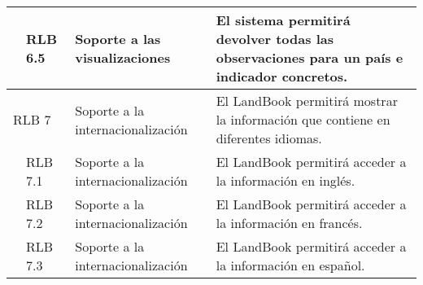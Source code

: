\begin{longtable}[c]{|p{1mm}|p{14mm}|p{30mm}|p{90mm}|}
\hline
& RLB 6.5 & Soporte a las visualizaciones & El sistema permitirá devolver todas las observaciones para un país e indicador concretos. \\
\hline
\multicolumn{2}{|l|}{RLB 7}  & Soporte a la internacionalización & El LandBook permitirá mostrar la información que contiene en diferentes idiomas. \\
\hline
& RLB 7.1 & Soporte a la internacionalización & El LandBook permitirá acceder a la información en inglés. \\
\hline
& RLB 7.2 & Soporte a la internacionalización & El LandBook permitirá acceder a la información en francés. \\
\hline
& RLB 7.3 & Soporte a la internacionalización & El LandBook permitirá acceder a la información en español. \\
\hline
\hline

 \end{longtable}